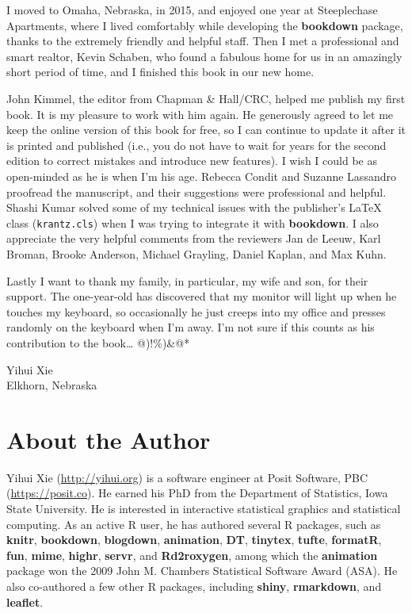 \documentclass[
  12pt,
]{krantz}
\theoremstyle{definition}
\theoremstyle{definition}
\theoremstyle{definition}
\theoremstyle{definition}
\theoremstyle{remark}
\begin{document}
I moved to Omaha, Nebraska, in 2015, and enjoyed one year at Steeplechase Apartments, where I lived comfortably while developing the \textbf{bookdown} package, thanks to the extremely friendly and helpful staff. Then I met a professional and smart realtor, Kevin Schaben, who found a fabulous home for us in an amazingly short period of time, and I finished this book in our new home.

John Kimmel, the editor from Chapman \& Hall/CRC, helped me publish my first book. It is my pleasure to work with him again. He generously agreed to let me keep the online version of this book for free, so I can continue to update it after it is printed and published (i.e., you do not have to wait for years for the second edition to correct mistakes and introduce new features). I wish I could be as open-minded as he is when I'm his age. Rebecca Condit and Suzanne Lassandro proofread the manuscript, and their suggestions were professional and helpful. Shashi Kumar solved some of my technical issues with the publisher's LaTeX class (\texttt{krantz.cls}) when I was trying to integrate it with \textbf{bookdown}. I also appreciate the very helpful comments from the reviewers Jan de Leeuw, Karl Broman, Brooke Anderson, Michael Grayling, Daniel Kaplan, and Max Kuhn.

Lastly I want to thank my family, in particular, my wife and son, for their support. The one-year-old has discovered that my monitor will light up when he touches my keyboard, so occasionally he just creeps into my office and presses randomly on the keyboard when I'm away. I'm not sure if this counts as his contribution to the book\ldots{} @)!\%)\&@*

\begin{flushright}
Yihui Xie\\
Elkhorn, Nebraska
\end{flushright}

\chapter*{About the Author}\label{about-the-author}


Yihui Xie (\url{http://yihui.org}) is a software engineer at Posit Software, PBC (\url{https://posit.co}). He earned his PhD from the Department of Statistics, Iowa State University. He is interested in interactive statistical graphics and statistical computing. As an active R user, he has authored several R packages, such as \textbf{knitr}, \textbf{bookdown}, \textbf{blogdown}, \textbf{animation}, \textbf{DT}, \textbf{tinytex}, \textbf{tufte}, \textbf{formatR}, \textbf{fun}, \textbf{mime}, \textbf{highr}, \textbf{servr}, and \textbf{Rd2roxygen}, among which the \textbf{animation} package won the 2009 John M. Chambers Statistical Software Award (ASA). He also co-authored a few other R packages, including \textbf{shiny}, \textbf{rmarkdown}, and \textbf{leaflet}.
\end{document}
